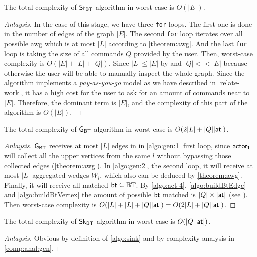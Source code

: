 \begin{complexity}\label{prop:comp-src}
The total complexity of $\mathsf{Sr_{BT}}$ algorithm in worst-case is $O(|E|)$.
\end{complexity}
\begin{proof}[Anlaysis]
In the case of this stage, we have three \texttt{for} loops. The first one is done in the number of edges of the graph $|E|$. The second \texttt{for} loop iterates over  
all possible \acrshort{awg} which is at most $|L|$ according to \autoref{theorem:awg}.
And the last \texttt{for} loop is taking the size of all commands $Q$ provided by the user. Then, worst-case complexity is $O(|E| + |L| + |Q|)$.
Since $|L| \leq |E|$ by  and $|Q| << |E|$ because otherwise the user will be able to manually inspect the whole graph. Since the algorithm implements a \emph{pay-as-you-go} model
as we have described in \autoref{relate-work}, it has a high cost for the user to ask for an amount of commands near to $|E|$.
Therefore, the dominant term is $|E|$, and the complexity of this part of the algorithm is $O(|E|)$.
\end{proof}

\begin{complexity}\label{comp:anal:gen}
The total complexity of $\mathsf{G_{BT}}$ algorithm in worst-case is $O(2|L| + |Q||\mathsf{at}|)$.
\end{complexity}
\begin{proof}[Anlaysis]
$\mathsf{G_{BT}}$ receives at most $|L|$ edges in in \autoref{algo:gen:1} first loop, since $\mathsf{actor_1}$ will collect all the upper vertices from the same $l$ without bypassing those collected edges (\autoref{theorem:awg}).
In \autoref{algo:gen:2}, the second loop, it will receive at most $|L|$ aggregated wedges $W_l$, which also can be deduced by \autoref{theorem:awg}.
Finally, it will receive all matched $\mathsf{bt} \subseteq \mathbb{BT}$. By \autoref{algo:act-4}, \autoref{algo:buildBtEdge} and \autoref{algo:buildBtVertex} the amount of possible $\mathsf{bt}$ matched is $|Q| \times |\mathsf{at}|$ (see ).
Then worst-case complexity is $O(|L| + |L| + |Q||\mathsf{at}|) = O(2|L| + |Q||\mathsf{at}|)$.
\end{proof}

\begin{complexity}
The total complexity of $\mathsf{Sk_{BT}}$ algorithm in worst-case is $O(|Q||\mathsf{at}|)$.
\end{complexity}
\begin{proof}[Anlaysis]
Obvious by definition of \autoref{algo:sink} and by complexity analysis in \autoref{comp:anal:gen}.
\end{proof}


